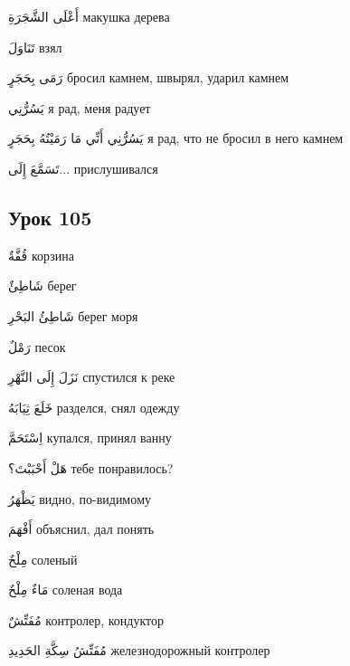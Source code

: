 \documentclass[a5paper]{article}
\newcommand\textstyleDropCaps[1]{#1}
\newcommand\textstyleCaptioncharacters[1]{#1}
\begin{document}
\textstyleCaptioncharacters{أَعْلَى الشَّجَرَةِ }\textstyleDropCaps{макушка дерева‎}

\textstyleCaptioncharacters{تَنَاوَلَ }\textstyleDropCaps{взял‎}

\textstyleCaptioncharacters{رَمَى بِحَجَرٍ }\textstyleDropCaps{бросил кам­нем, швырял, ударил камнем‎}

\textstyleCaptioncharacters{يَسُرُّنِي }\textstyleDropCaps{я рад, меня радует‎}

\textstyleCaptioncharacters{يَسُرُّنِي أَنِّي مَا رَمَيْتُهُ بِحَجَرٍ }\textstyleDropCaps{я рад, что не бросил в него камнем ‎}

\textstyleCaptioncharacters{تَسَمَّعَ إِلَى... }\textstyleDropCaps{прислуши­вался‎}

\subsection[Урок 105‎]{\textstyleDropCaps{Урок 105‎}}
\textstyleCaptioncharacters{قُفَّةٌ }\textstyleDropCaps{корзина‎}

\textstyleCaptioncharacters{شَاطِئٌ }\textstyleDropCaps{берег‎}

\textstyleCaptioncharacters{شَاطِئُ البَحْرِ }\textstyleDropCaps{берег моря‎}

\textstyleCaptioncharacters{رَمْلٌ }\textstyleDropCaps{песок‎}

\textstyleCaptioncharacters{نَزَلَ إِلَى النَّهْرِ }\textstyleDropCaps{спустил­ся к реке‎}

\textstyleCaptioncharacters{خَلَعَ ثِيَابَهُ }\textstyleDropCaps{разделся, снял одежду‎}

\textstyleCaptioncharacters{اِسْتَحَمَّ }\textstyleDropCaps{купался, принял ванну‎}

\textstyleCaptioncharacters{هَلْ أَحْبَبْتَ؟ }\textstyleDropCaps{тебе по­нравилось?‎}

\textstyleCaptioncharacters{يَظْهَرُ }\textstyleDropCaps{видно, по-видимо­му‎}

\textstyleCaptioncharacters{أَفْهَمَ }\textstyleDropCaps{объяснил, дал по­нять‎}

\textstyleCaptioncharacters{مِلْحٌ }\textstyleDropCaps{соленый‎}

\textstyleCaptioncharacters{مَاءٌ مِلْحٌ }\textstyleDropCaps{соленая вода‎}

\textstyleCaptioncharacters{مُفَتِّشٌ }\textstyleDropCaps{контролер, кон­дуктор‎}

\textstyleCaptioncharacters{مُفَتِّشُ سِكَّةِ الحَدِيدِ }\textstyleDropCaps{железнодорожный контролер‎}
\end{document}
